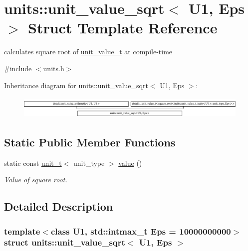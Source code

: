 \hypertarget{structunits_1_1unit__value__sqrt}{}\section{units\+:\+:unit\+\_\+value\+\_\+sqrt$<$ U1, Eps $>$ Struct Template Reference}
\label{structunits_1_1unit__value__sqrt}


calculates square root of \hyperlink{structunits_1_1unit__value__t}{unit\+\_\+value\+\_\+t} at compile-\/time  




{\ttfamily \#include $<$units.\+h$>$}

Inheritance diagram for units\+:\+:unit\+\_\+value\+\_\+sqrt$<$ U1, Eps $>$\+:\begin{figure}[H]
\begin{center}
\leavevmode
\includegraphics[height=1.104536cm]{structunits_1_1unit__value__sqrt}
\end{center}
\end{figure}
\subsection*{Static Public Member Functions}
\begin{DoxyCompactItemize}
\item 
static const \hyperlink{classunits_1_1unit__t}{unit\+\_\+t}$<$ unit\+\_\+type $>$ \hyperlink{structunits_1_1unit__value__sqrt_a62c14b16e45cbbf2db6b721c7aece287}{value} ()
\begin{DoxyCompactList}\small\item\em Value of square root. \end{DoxyCompactList}\end{DoxyCompactItemize}


\subsection{Detailed Description}
\subsubsection*{template$<$class U1, std\+::intmax\+\_\+t Eps = 10000000000$>$struct units\+::unit\+\_\+value\+\_\+sqrt$<$ U1, Eps $>$}

